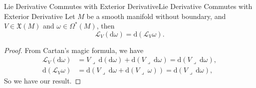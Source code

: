 \documentclass[../main.tex]{subfiles}
\begin{document}
\begin{corollary}{Lie Derivative Commutes with Exterior Derivative}{Lie Derivative Commutes with Exterior Derivative}
  Let $M$ be a smooth manifold without boundary, and $V \in \mathfrak{X}(M)$ and $\omega \in \Omega^*(M)$, then
  \begin{equation*}
    \mathcal{L}_V (\mathrm{d} \omega) = \mathrm{d} (\mathcal{L}_V \omega).
  \end{equation*}
\end{corollary}
\begin{proof}
  From Cartan's magic formula, we have
  \begin{equation*}
    \begin{aligned}
      \mathcal{L}_V (\mathrm{d} \omega) &= V \lrcorner \ \mathrm{d} (\mathrm{d} \omega) + \mathrm{d} (V \lrcorner \ \mathrm{d} \omega) = \mathrm{d} (V \lrcorner \ \mathrm{d} \omega),\\
      \mathrm{d} (\mathcal{L}_V \omega) &=  \mathrm{d} (V \lrcorner \ \mathrm{d} \omega + \mathrm{d} (V \lrcorner \ \omega)) =  \mathrm{d} (V \lrcorner \ \mathrm{d} \omega),
    \end{aligned}
  \end{equation*}
  So we have our result.
\end{proof}
\end{document}
